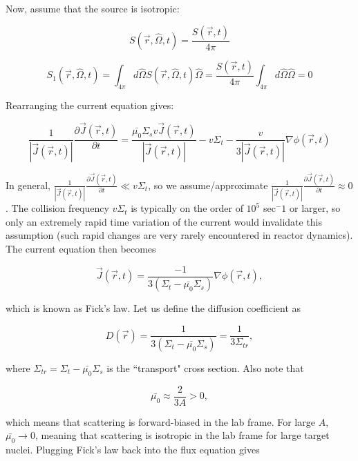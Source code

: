 \documentclass[12pt]{article}
\newcommand{\rvec}{\ensuremath{\vec{r}}}
\newcommand{\omvec}{\ensuremath{\hat{\Omega}}}
\begin{document}
Now, assume that the source is isotropic:

\begin{equation*}
S(\rvec,\omvec,t) = \frac{S(\rvec,t)}{4\pi}
\end{equation*}

\begin{equation*}
S_1(\rvec,\omvec,t) = \int_{4\pi}d\omvec S(\rvec,\omvec,t)\omvec 
= \frac{S(\rvec,t)}{4\pi} \int_{4\pi}d\omvec\omvec = 0
\end{equation*}

Rearranging the current equation gives:

\begin{equation*}
\frac{1}{|\vec{J}(\rvec,t)|}\frac{\partial\vec{J}(\rvec,t)}{\partial t} 
= \frac{\bar{\mu_0}\Sigma_sv\vec{J}(\rvec,t)}{|\vec{J}(\rvec,t)|} - v\Sigma_t 
- \frac{v}{3|\vec{J}(\rvec,t)|}\nabla\phi(\rvec,t)
\end{equation*}

In general, $\frac{1}{|\vec{J}(\rvec,t)|}\frac{\partial\vec{J}(\rvec,t)}{\partial t} \ll v\Sigma_t$, so we
assume/approximate $\frac{1}{|\vec{J}(\rvec,t)|}\frac{\partial\vec{J}(\rvec,t)}{\partial t}\approx 0$. The
collision frequency $v\Sigma_t$ is typically on the order of $10^5$ sec${^-1}$ or larger, so only an
extremely rapid time variation of the current would invalidate this assumption (such rapid changes are
very rarely encountered in reactor dynamics). The current equation then becomes

\begin{equation*}
\vec{J}(\rvec,t) = \frac{-1}{3(\Sigma_t - \bar{\mu_0}\Sigma_s)}\nabla\phi(\rvec,t),
\end{equation*}

which is known as Fick's law. Let us define the diffusion coefficient as

\begin{equation*}
D(\rvec) = \frac{1}{3(\Sigma_t - \bar{\mu_0}\Sigma_s)} = \frac{1}{3\Sigma_{tr}},
\end{equation*}

where $\Sigma_{tr} = \Sigma_t - \bar{\mu_0}\Sigma_s$ is the ``transport" cross section. Also note that

\begin{equation*}
\bar{\mu_0} \approx \frac{2}{3A} > 0,
\end{equation*}

which means that scattering is forward-biased in the lab frame. For large $A$, $\bar{\mu_0}\rightarrow0$,
meaning that scattering is isotropic in the lab frame for large target nuclei. Plugging Fick's law back 
into the flux equation gives
\end{document}
